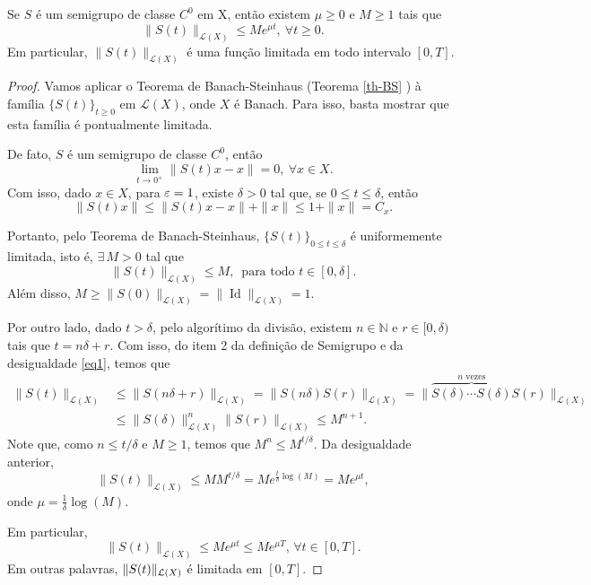 \begin{proposition}
    Se $S$ é um semigrupo de classe $C^0$ em X, então existem $\mu\geq 0$ e $M\geq 1$ tais que 
    \begin{equation}\label{des.wT}
    \|S(t)\|_{\mathcal{L}(X)}\leq Me^{\mu t},\ \forall t\geq 0.  
    \end{equation}    
    Em particular, $\|S(t)\|_{\mathcal{L}(X)}$ é uma função limitada em todo intervalo $[0,T]$. 
\end{proposition}

\begin{proof}
Vamos aplicar o Teorema de Banach-Steinhaus (Teorema \ref{th-BS} )  à família  $\{S(t)\}_{t\geq 0}$ em $\mathcal{L}(X)$, onde $X$ é Banach. Para isso, basta mostrar que esta família é pontualmente limitada. 

De fato,  $S$ é um semigrupo de classe $C^0$, então
\[\lim\limits_{t\to 0^+}\|S(t)x-x\|=0,\ \forall x\in X.\]
Com isso, dado $x\in X$, para $\varepsilon=1$, existe $\delta>0$ tal que, se $0\leq t\leq \delta$, então
\[\|S(t)x\|\leq \|S(t)x-x\|+\|x\|\leq 1+\|x\|=C_x.\]

Portanto, pelo Teorema de Banach-Steinhaus, $\{S(t)\}_{0\leq t\leq\delta}$ é uniformemente limitada, isto é, $\exists\, M>0$ tal que
\begin{equation}\label{eq1}
\|S(t)\|_{\mathcal{L}(X)}\leq M,\, \text{ para todo  } t\in [0,\delta]. 
\end{equation}
Além disso, $M\geq \|S(0)\|_{\mathcal{L}(X)}=\|\operatorname{Id}\|_{\mathcal{L}(X)}=1$.

Por outro lado, dado $t>\delta$, pelo algorítimo da divisão, existem $n\in\mathbb{N}$ e $r\in [0,\delta)$ tais que $t=n\delta+r$. Com isso, do item 2 da definição de Semigrupo e da desigualdade \eqref{eq1}, temos que
\begin{align*}
 \|S(t)\|_{\mathcal{L}(X)} &
 \leq \|S(n\delta +r)\|_{\mathcal{L}(X)}= \|S(n\delta)S(r)\|_{\mathcal{L}(X)}=
 \|\overbrace{S(\delta)\cdots S(\delta)}^{n \text{ vezes}}S(r)\|_{\mathcal{L}(X)}\\
& \leq 
\|S(\delta)\|^n_{\mathcal{L}(X)}\|S(r)\|_{\mathcal{L}(X)}\leq M^{n+1}. 
\end{align*}
 Note que, como $n\leq t/\delta$ e $M\geq 1$, temos que $M^n\leq M^{t/\delta}$. Da desigualdade anterior,
\[\|S(t)\|_{\mathcal{L}(X)}\leq M M^{t/\delta}=Me^{\frac{t}{\delta}\log(M)}
=Me^{\mu t},\]
onde $\mu=\frac{1}{\delta}\log(M)$.

Em particular, 
\[\|S(t)\|_{\mathcal{L}(X)}\leq Me^{\mu t}\leq Me^{\mu T},\, \forall t\in [0,T].\]
Em outras palavras, $\|S(t)\|_{\mathcal{L}(X)}$ é limitada em $[0,T]$.
\end{proof}


